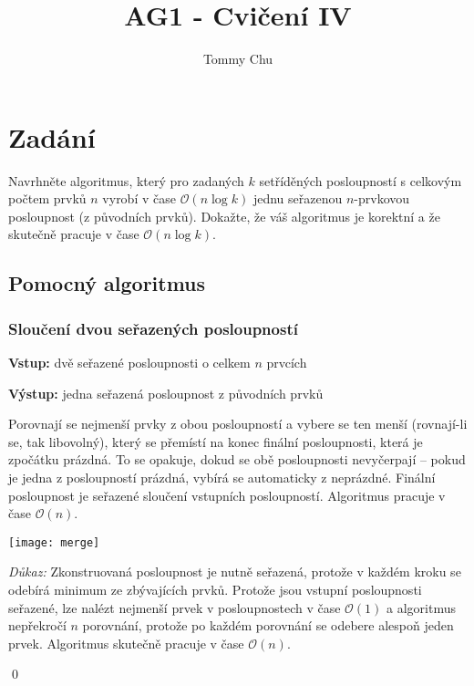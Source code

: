 \documentclass{article}
\title{AG1 - Cvičení IV}
\author{Tommy Chu}
\date{}
\begin{document}
\maketitle

\section{Zadání}

Navrhněte algoritmus, který pro zadaných $k$ setříděných posloupností s celkovým počtem prvků $n$ vyrobí v čase $\mathcal{O}(n \log k)$ jednu seřazenou $n$-prvkovou posloupnost (z původních prvků). Dokažte, že váš algoritmus je korektní a že skutečně pracuje v čase $\mathcal{O}(n \log k)$.

\subsection{Pomocný algoritmus}

\subsubsection*{Sloučení dvou seřazených posloupností}

\textbf{Vstup:} dvě seřazené posloupnosti o celkem $n$ prvcích

\textbf{Výstup:} jedna seřazená posloupnost z původních prvků

Porovnají se nejmenší prvky z obou posloupností a vybere se ten menší (rovnají-li se, tak libovolný), který se přemístí na konec finální posloupnosti, která je zpočátku prázdná. To se opakuje, dokud se obě posloupnosti nevyčerpají -- pokud je jedna z posloupností prázdná, vybírá se automaticky z neprázdné. Finální posloupnost je seřazené sloučení vstupních posloupností. Algoritmus pracuje v čase $\mathcal{O}(n)$.

\begin{center}
    \texttt{[image: merge]}
\end{center}

\textit{Důkaz:} Zkonstruovaná posloupnost je nutně seřazená, protože v každém kroku se odebírá minimum ze zbývajících prvků. Protože jsou vstupní posloupnosti seřazené, lze nalézt nejmenší prvek v posloupnostech v čase $\mathcal{O}(1)$ a algoritmus nepřekročí $n$ porovnání, protože po každém porovnání se odebere alespoň jeden prvek. Algoritmus skutečně pracuje v čase $\mathcal{O}(n)$.

\qed

\newpage
\end{document}
